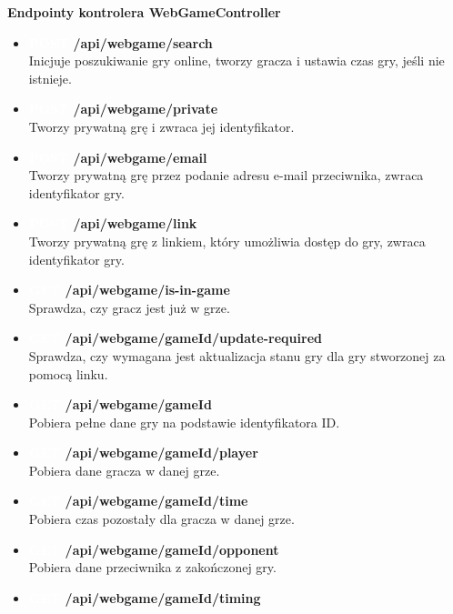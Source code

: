 \documentclass[12pt,a4paper]{article}
\begin{document}
\textbf{Endpointy kontrolera WebGameController}
\begin{itemize} 
    \item \textbf{\colorbox{green!90}{\textcolor{white}{POST}} /api/webgame/search} \\
    Inicjuje poszukiwanie gry online, tworzy gracza i ustawia czas gry, jeśli nie istnieje. 
    \item \textbf{\colorbox{green!90}{\textcolor{white}{POST}} /api/webgame/private} \\
    Tworzy prywatną grę i zwraca jej identyfikator. 
    \item \textbf{\colorbox{green!90}{\textcolor{white}{POST}} /api/webgame/email} \\
    Tworzy prywatną grę przez podanie adresu e-mail przeciwnika, zwraca identyfikator gry. 
    \item \textbf{\colorbox{green!90}{\textcolor{white}{POST}} /api/webgame/link} \\
    Tworzy prywatną grę z linkiem, który umożliwia dostęp do gry, zwraca identyfikator gry. 
    \item \textbf{\colorbox{cyan!90}{\textcolor{white}{GET}} /api/webgame/is-in-game} \\
    Sprawdza, czy gracz jest już w grze. 
    \item \textbf{\colorbox{cyan!90}{\textcolor{white}{GET}} /api/webgame/{gameId}/update-required} \\
    Sprawdza, czy wymagana jest aktualizacja stanu gry dla gry stworzonej za pomocą linku. 
    \item \textbf{\colorbox{cyan!90}{\textcolor{white}{GET}} /api/webgame/{gameId}} \\
    Pobiera pełne dane gry na podstawie identyfikatora ID. 
    \item \textbf{\colorbox{cyan!90}{\textcolor{white}{GET}} /api/webgame/{gameId}/player} \\
    Pobiera dane gracza w danej grze. 
    \item \textbf{\colorbox{cyan!90}{\textcolor{white}{GET}} /api/webgame/{gameId}/time} \\
    Pobiera czas pozostały dla gracza w danej grze. 
    \item \textbf{\colorbox{cyan!90}{\textcolor{white}{GET}} /api/webgame/{gameId}/opponent} \\
    Pobiera dane przeciwnika z zakończonej gry. 
    \item \textbf{\colorbox{cyan!90}{\textcolor{white}{GET}} /api/webgame/{gameId}/timing} \\

\end{itemize}
\end{document}

